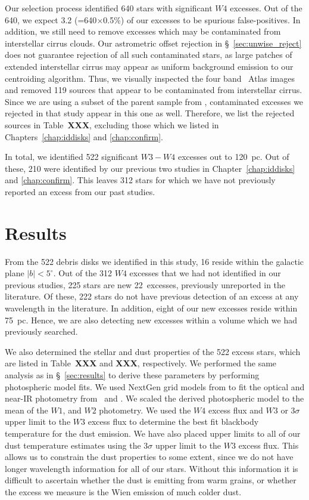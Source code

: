     Our selection process identified 640 stars with significant $W4$ excesses. Out of the 640, we expect 3.2 (=640$\times$0.5\%) of our excesses to be spurious false-positives. In addition, we still need to remove excesses which may be contaminated from interstellar cirrus clouds. Our astrometric offset rejection in \S~\ref{sec:unwise_reject} does not guarantee rejection of all such contaminated stars, as large patches of extended interstellar cirrus may appear as uniform background emission to our centroiding algorithm. Thus, we visually inspected the four band \WS\ Atlas images and removed 119 sources that appear to be contaminated from interstellar cirrus. Since we are using a subset of the parent sample from \citet{Patel2014}, contaminated excesses we rejected in that study appear in this one as well. Therefore, we list the rejected sources in Table~\textbf{XXX}, excluding those which we listed in Chapters~\ref{chap:iddisks} and \ref{chap:confirm}. 
    
    In total, we identified 522 significant $W3-W4$ excesses out to 120~pc. Out of these, 210 were identified by our previous two studies in Chapter~\ref{chap:iddisks} and \ref{chap:confirm}. This leaves 312 stars for which we have not previously reported an excess from our past studies.
    
    \section{Results}
    
    From the 522 debris disks we identified in this study, 16 reside within the galactic plane $|b|<5^{\circ}$. Out of the 312 $W4$ excesses that we had not identified in our previous studies, 225 stars are new 22\micron\ excesses, previously unreported in the literature. Of these, 222 stars do not have previous detection of an excess at any wavelength in the literature. In addition, eight of our new excesses reside within 75~pc. Hence, we are also detecting new excesses within a volume which we had previously searched. 
    
    We also determined the stellar and dust properties of the 522 excess stars, which are listed in Table~\textbf{XXX} and \textbf{XXX}, respectively. We performed the same analysis as in \S~\ref{sec:results} to derive these parameters by performing photospheric model fits. We used NextGen grid models from \citet{Hauschildt1999} to fit the optical and near-IR photometry from \hip\ and \mass. We scaled the derived photospheric model to the mean of the $W1$, and $W2$ photometry. We used the $W4$ excess flux and $W3$ or 3$\sigma$ upper limit to the $W3$ excess flux to determine the best fit blackbody temperature for the dust emission. We have also placed upper limits to all of our dust temperature estimates using the 3$\sigma$ upper limit to the $W3$ excess flux. This allows us to constrain the dust properties to some extent, since we do not have longer wavelength information for all of our stars. Without this information it is difficult to ascertain whether the dust is emitting from warm grains, or whether the excess we measure is the Wien emission of much colder dust. 
    
